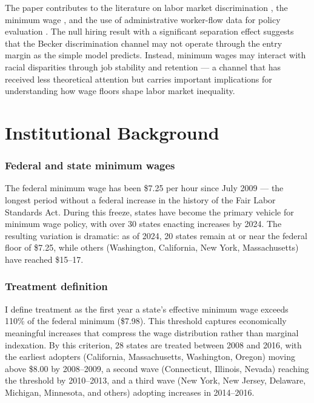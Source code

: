 \documentclass[12pt]{article}
\begin{document}
The paper contributes to the literature on labor market discrimination \citep{becker1957economics, charles2008prejudice, lang2020racial}, the minimum wage \citep{dube2019fairness, manning2021elusive}, and the use of administrative worker-flow data for policy evaluation \citep{abowd2009economics}. The null hiring result with a significant separation effect suggests that the Becker discrimination channel may not operate through the entry margin as the simple model predicts. Instead, minimum wages may interact with racial disparities through job stability and retention --- a channel that has received less theoretical attention but carries important implications for understanding how wage floors shape labor market inequality.


\section{Institutional Background}

\subsubsection*{Federal and state minimum wages}  The federal minimum wage has been \$7.25 per hour since July 2009 --- the longest period without a federal increase in the history of the Fair Labor Standards Act. During this freeze, states have become the primary vehicle for minimum wage policy, with over 30 states enacting increases by 2024. The resulting variation is dramatic: as of 2024, 20 states remain at or near the federal floor of \$7.25, while others (Washington, California, New York, Massachusetts) have reached \$15--17.

\subsubsection*{Treatment definition}  I define treatment as the first year a state's effective minimum wage exceeds 110\% of the federal minimum (\$7.98). This threshold captures economically meaningful increases that compress the wage distribution rather than marginal indexation. By this criterion, 28 states are treated between 2008 and 2016, with the earliest adopters (California, Massachusetts, Washington, Oregon) moving above \$8.00 by 2008--2009, a second wave (Connecticut, Illinois, Nevada) reaching the threshold by 2010--2013, and a third wave (New York, New Jersey, Delaware, Michigan, Minnesota, and others) adopting increases in 2014--2016.
\end{document}
